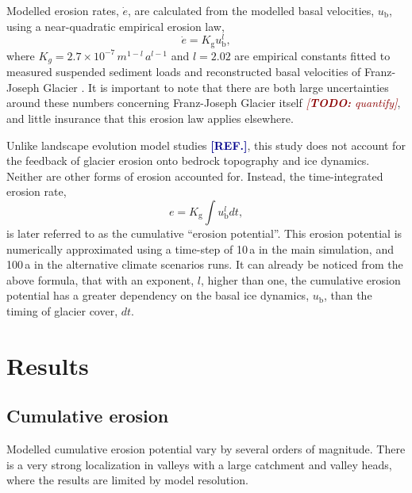 \documentclass[utf8]{article}
\newcommand{\todo}[1]{\textcolor{darkred}{\emph{[\textbf{TODO:} #1]}}}
\newcommand{\aref}[0]{\textcolor{darkblue}{\textbf{[REF.]}}}
\begin{document}
    Modelled erosion rates, $\dot{e}$, are calculated from the modelled basal
    velocities, $u_\mathrm{b}$, using a near-quadratic empirical erosion law,
    \begin{equation}
        \dot{e} = K_\mathrm{g} u_\mathrm{b}^l ,
    \end{equation}
    where $K_g = 2.7\times 10^{-7}\,m^{1-l}\,a^{l-1}$ and $l = 2.02$ are
    empirical constants fitted to measured suspended sediment loads and
    reconstructed basal velocities of Franz-Joseph Glacier
    \citep{Herman.etal.2015}. It is important to note that there are both large
    uncertainties around these numbers concerning Franz-Joseph Glacier
    itself \todo{quantify}, and little insurance that this erosion law applies
    elsewhere.

    Unlike landscape evolution model studies \aref, this study does not account
    for the feedback of glacier erosion onto bedrock topography and ice dynamics.
    Neither are other forms of erosion accounted for. Instead, the
    time-integrated erosion rate,
    \begin{equation}
        e =  K_\mathrm{g} \int u_\mathrm{b}^l dt,
    \end{equation}
    is later referred to as the cumulative ``erosion potential''. This erosion
    potential is numerically approximated using a time-step of 10\,a in the
    main simulation, and 100\,a in the alternative climate scenarios runs. It
    can already be noticed from the above formula, that with an exponent, $l$,
    higher than one, the cumulative erosion potential has a greater dependency
    on the basal ice dynamics, $u_\mathrm{b}$, than the timing of glacier
    cover, $dt$.


\section{Results}

\subsection{Cumulative erosion}

    Modelled cumulative erosion potential vary by several orders of magnitude.
    There is a very strong localization in valleys with a large catchment and
    valley heads, where the results are limited by model resolution.
\end{document}
